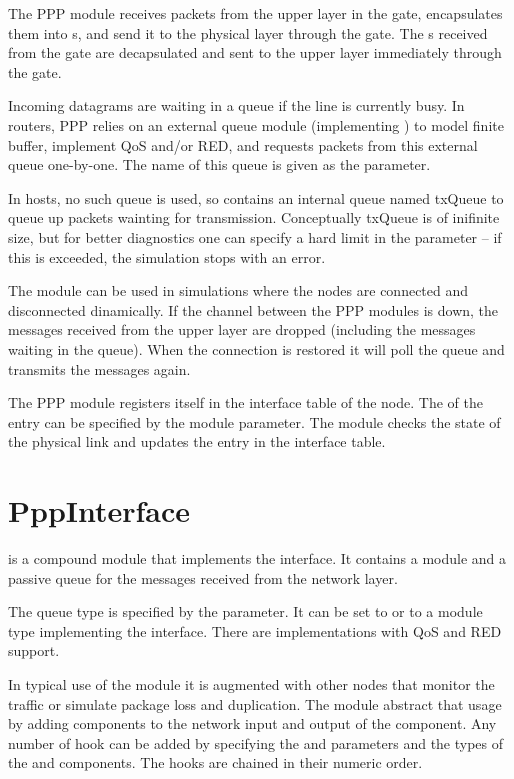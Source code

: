 The PPP module receives packets from the upper layer in the 
gate, encapsulates them into s, and send it to the
physical layer through the  gate. The s
received from the  gate are decapsulated and sent to the upper
layer immediately through the  gate.

Incoming datagrams are waiting in a queue if the line is currently busy.
In routers, PPP relies on an external queue module (implementing
) to model finite buffer, implement QoS and/or RED,
and requests packets from this external queue one-by-one. The name
of this queue is given as the  parameter.

In hosts, no such queue is used, so  contains an internal
queue named txQueue to queue up packets wainting for transmission.
Conceptually txQueue is of inifinite size, but for better diagnostics
one can specify a hard limit in the  parameter -- if
this is exceeded, the simulation stops with an error.

The module can be used in simulations where the nodes are connected and
disconnected dinamically. If the channel between the PPP modules is down,
the messages received from the upper layer are dropped (including the messages
waiting in the queue). When the connection is restored it will
poll the queue and transmits the messages again.

The PPP module registers itself in the interface table of the node.
The  of the entry can be specified by the
 module parameter. The module checks the state of the physical link
and updates the entry in the interface table.

\section{PppInterface}
\label{sec:ppp:pppinterface}

 is a compound module that implements the
 interface. It contains a 
module and a passive queue for the messages received from the network layer.

The queue type is specified by the  parameter.
It can be set to  or to a module type implementing
the  interface. There are implementations
with QoS and RED support.

In typical use of the  module it is augmented with other nodes
that monitor the traffic or simulate package loss and duplication.
The  module abstract that usage by adding
 components to the network input and output of the
 component. Any number of hook can be added by
specifying the  and 
parameters and the types of the  and 
components. The hooks are chained in their numeric order.





